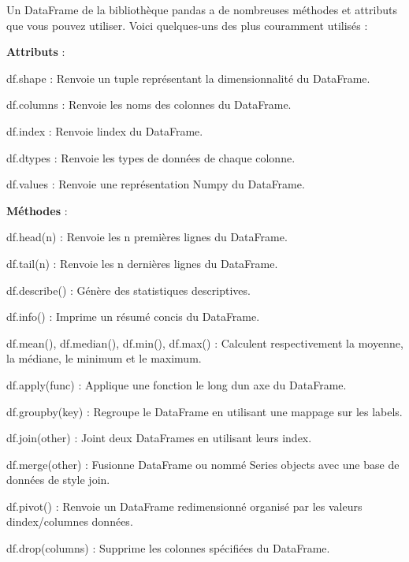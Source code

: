 Un Data\+Frame de la bibliothèque pandas a de nombreuses méthodes et attributs que vous pouvez utiliser. Voici quelques-\/uns des plus couramment utilisés \+:


\begin{DoxyItemize}
\item {\bfseries Attributs} \+:
\begin{DoxyItemize}
\item {\ttfamily df.\+shape} \+: Renvoie un tuple représentant la dimensionnalité du Data\+Frame.
\item {\ttfamily df.\+columns} \+: Renvoie les noms des colonnes du Data\+Frame.
\item {\ttfamily df.\+index} \+: Renvoie l\textquotesingle{}index du Data\+Frame.
\item {\ttfamily df.\+dtypes} \+: Renvoie les types de données de chaque colonne.
\item {\ttfamily df.\+values} \+: Renvoie une représentation Numpy du Data\+Frame.
\end{DoxyItemize}
\item {\bfseries Méthodes} \+:
\begin{DoxyItemize}
\item {\ttfamily df.\+head(n)} \+: Renvoie les {\ttfamily n} premières lignes du Data\+Frame.
\item {\ttfamily df.\+tail(n)} \+: Renvoie les {\ttfamily n} dernières lignes du Data\+Frame.
\item {\ttfamily df.\+describe()} \+: Génère des statistiques descriptives.
\item {\ttfamily df.\+info()} \+: Imprime un résumé concis du Data\+Frame.
\item {\ttfamily df.\+mean()}, {\ttfamily df.\+median()}, {\ttfamily df.\+min()}, {\ttfamily df.\+max()} \+: Calculent respectivement la moyenne, la médiane, le minimum et le maximum.
\item {\ttfamily df.\+apply(func)} \+: Applique une fonction le long d\textquotesingle{}un axe du Data\+Frame.
\item {\ttfamily df.\+groupby(key)} \+: Regroupe le Data\+Frame en utilisant une mappage sur les labels.
\item {\ttfamily df.\+join(other)} \+: Joint deux Data\+Frames en utilisant leurs index.
\item {\ttfamily df.\+merge(other)} \+: Fusionne Data\+Frame ou nommé Series objects avec une base de données de style join.
\item {\ttfamily df.\+pivot()} \+: Renvoie un Data\+Frame redimensionné organisé par les valeurs d\textquotesingle{}index/columnes données.
\item {\ttfamily df.\+drop(columns)} \+: Supprime les colonnes spécifiées du Data\+Frame. 
\end{DoxyItemize}
\end{DoxyItemize}